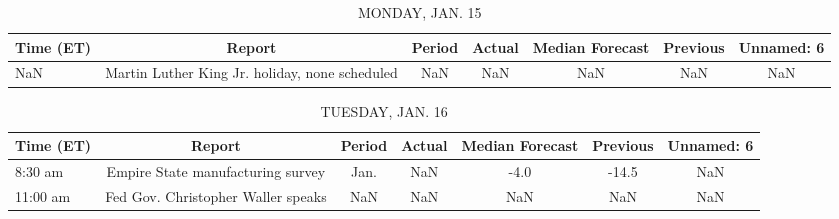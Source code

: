\documentclass{article}%
\begin{document}
%
\normalsize%


\begin{table}[htbp]%
\caption{MONDAY, JAN. 15}%
\centering%
\begin{adjustbox}{width=1\textwidth}%
\begin{tabular}{lcccccc}
\toprule
Time (ET) &                                         Report & Period & Actual & Median Forecast & Previous & Unnamed: 6 \\
\midrule
      NaN & Martin Luther King Jr. holiday, none scheduled &    NaN &    NaN &             NaN &      NaN &        NaN \\
\bottomrule
\end{tabular}
%
\end{adjustbox}%
\end{table}

%


\begin{table}[htbp]%
\caption{TUESDAY, JAN. 16}%
\centering%
\begin{adjustbox}{width=1\textwidth}%
\begin{tabular}{lcccccc}
\toprule
Time (ET) &                             Report & Period & Actual & Median Forecast & Previous & Unnamed: 6 \\
\midrule
  8:30 am &  Empire State manufacturing survey &   Jan. &    NaN &            -4.0 &    -14.5 &        NaN \\
 11:00 am & Fed Gov. Christopher Waller speaks &    NaN &    NaN &             NaN &      NaN &        NaN \\
\bottomrule
\end{tabular}
%
\end{adjustbox}%
\end{table}

%
\end{document}
